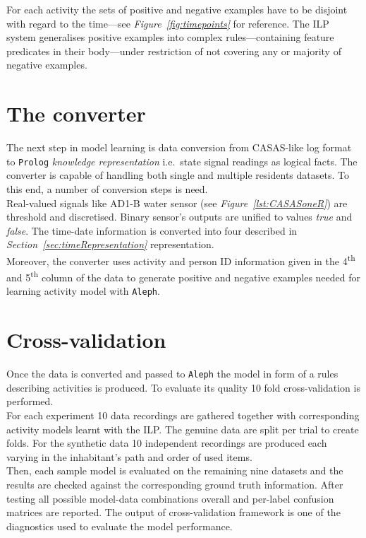 \documentclass[10pt, a4paper, pdflatex, leqno, twoside, openright]{report}
\newcommand{\ts}{\textsuperscript}
\begin{document}
For each activity the sets of positive and negative examples have to be disjoint with regard to the time---see \emph{Figure~\ref{fig:timepoints}} for reference. The ILP system generalises positive examples into complex rules---containing feature predicates in their body---under restriction of not covering any or majority of negative examples.

  \section{The converter}
The next step in model learning is data conversion from CASAS-like log format to \texttt{Prolog} \emph{knowledge representation} i.e.\ state signal readings as logical facts. The converter is capable of handling both single and multiple residents datasets. To this end, a number of conversion steps is need.\\

Real-valued signals like AD1-B water sensor (see \emph{Figure~\ref{lst:CASASoneR}}) are threshold and discretised. Binary sensor's outputs are unified to values \emph{true} and \emph{false}. The time-date information is converted into four described in \emph{Section~\ref{sec:timeRepresentation}} representation.\\
Moreover, the converter uses activity and person ID information given in the 4\ts{th} and 5\ts{th} column of the data to generate positive and negative examples needed for learning activity model with \texttt{Aleph}.

  \section{Cross-validation}
Once the data is converted and passed to \texttt{Aleph} the model in form of a rules describing activities is produced. To evaluate its quality 10 fold cross-validation is performed.\\
For each experiment 10 data recordings are gathered together with corresponding activity models learnt with the ILP. The genuine data are split per trial to create folds. For the synthetic data 10 independent recordings are produced each varying in the inhabitant's path and order of used items.\\
Then, each sample model is evaluated on the remaining nine datasets and the results are checked against the corresponding ground truth information. After testing all possible model-data combinations overall and per-label confusion matrices are reported. The output of cross-validation framework is one of the diagnostics used to evaluate the model performance.
\end{document}
